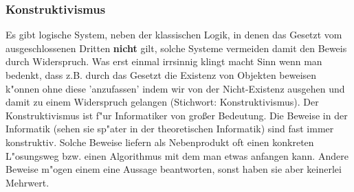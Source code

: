 \subsubsection*{Konstruktivismus}
Es gibt logische System, neben der klassischen Logik, in denen das Gesetzt vom ausgeschlossenen Dritten \textbf{nicht} gilt, solche Systeme vermeiden damit den Beweis durch Widerspruch. Was erst einmal irrsinnig klingt macht Sinn wenn man bedenkt, dass z.B. durch das Gesetzt die Existenz von Objekten beweisen k"onnen ohne diese 'anzufassen' indem wir von der Nicht-Existenz ausgehen und damit zu einem Widerspruch gelangen (Stichwort: Konstruktivismus). Der Konstruktivismus ist f"ur Informatiker von gro{\ss}er Bedeutung. Die Beweise in der Informatik (sehen sie sp"ater in der theoretischen Informatik) sind fast immer konstruktiv. Solche Beweise liefern als Nebenprodukt oft einen konkreten L"osungsweg bzw. einen Algorithmus mit dem man etwas anfangen kann. Andere Beweise m"ogen einem eine Aussage beantworten, sonst haben sie aber keinerlei Mehrwert.
